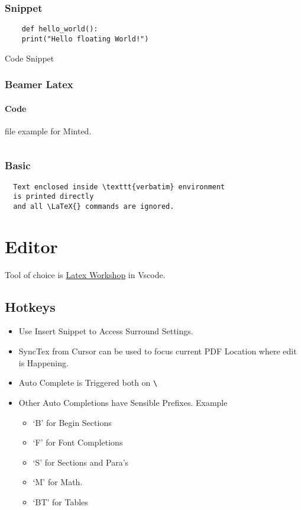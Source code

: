 \documentclass{report}[a4paper,12pt] %
\begin{document}
\subsubsection{Snippet}
\begin{listing}[h]
  \begin{verbatim}
    def hello_world():
    print("Hello floating World!")
  \end{verbatim}
  \caption{Code Snippet}
  \label{code:snippet}
\end{listing}

\subsubsection{Beamer Latex}
\label{code:file}
\paragraph{Code} file example for Minted.
\inputminted{tex}{../../presentation/beamer/tutorial.tex} 

\subsubsection{Basic}
\begin{verbatim}
  Text enclosed inside \texttt{verbatim} environment 
  is printed directly 
  and all \LaTeX{} commands are ignored.
\end{verbatim}

\section{Editor}
Tool of choice is \href{https://github.com/James-Yu/LaTeX-Workshop}{Latex Workshop} in Vscode.
\subsection{Hotkeys}
\begin{itemize}
  \item Use Insert Snippet to Access Surround Settings.
  \item SyncTex from Cursor can be used to focus current PDF Location where edit is Happening.
  \item Auto Complete is Triggered both on \verb|\|
  \item Other Auto Completions have Sensible Prefixes. Example
  \begin{itemize}
    \item `B' for Begin Sections
    \item `F' for Font Completions
    \item `S' for Sections and Para's
    \item `M' for Math.
    \item `BT' for Tables
  \end{itemize}
\end{itemize}
\end{document}
